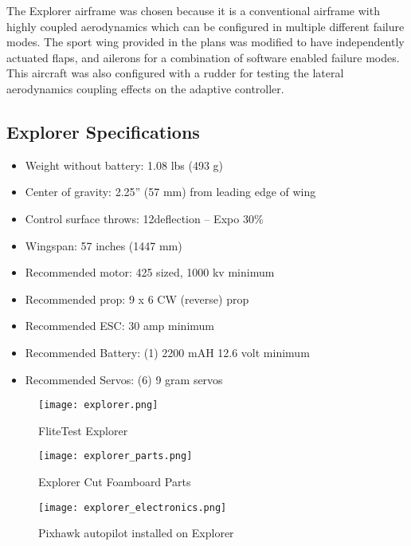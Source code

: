 The Explorer airframe was chosen because it is a conventional airframe with highly coupled aerodynamics which can be configured in multiple different failure modes.  The sport wing provided in the plans was modified to have independently actuated flaps, and ailerons for a combination of software enabled failure modes.  This aircraft was also configured with a rudder for testing the lateral aerodynamics coupling effects on the adaptive controller.  

\subsection{Explorer Specifications}
\begin{itemize}
 \item Weight without battery: 1.08 lbs (493 g)
 \item Center of gravity: 2.25” (57 mm) from leading edge of wing
 \item Control surface throws: 12\degrees  deflection – Expo 30\%
 \item Wingspan: 57 inches (1447 mm)
 \item Recommended motor: 425 sized, 1000 kv minimum
 \item Recommended prop: 9 x 6 CW (reverse) prop
 \item Recommended ESC: 30 amp minimum
 \item Recommended Battery: (1) 2200 mAH 12.6 volt minimum
 \item Recommended Servos: (6) 9 gram servos 
\end{itemize}

\begin{figure}[!h]
 \centering
  \texttt{[image: explorer.png]}
  \caption{FliteTest Explorer \cite{flitetest}}
  \label{fig:explorer_parts}
\end{figure}

\begin{figure}[!h]
 \centering
  \texttt{[image: explorer\_parts.png]}
  \caption{Explorer Cut Foamboard Parts}
  \label{fig:explorer_parts}
\end{figure}

\begin{figure}[!h]
 \centering
  \texttt{[image: explorer\_electronics.png]}
  \caption{Pixhawk autopilot installed on Explorer}
  \label{fig:explorer_electronics}
\end{figure}





